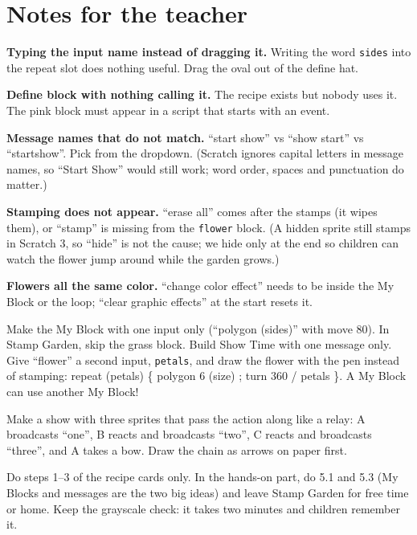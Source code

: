 \section{Notes for the teacher}
\begin{commonmistakes}
  \item \textbf{Typing the input name instead of dragging it.} Writing the word \texttt{sides} into the repeat slot does nothing useful. Drag the oval out of the define hat.
  \item \textbf{Define block with nothing calling it.} The recipe exists but nobody uses it. The pink block must appear in a script that starts with an event.
  \item \textbf{Message names that do not match.} \enquote{start show} vs \enquote{show start} vs \enquote{startshow}. Pick from the dropdown. (Scratch ignores capital letters in message names, so \enquote{Start Show} would still work; word order, spaces and punctuation do matter.)
  \item \textbf{Stamping does not appear.} \enquote{erase all} comes after the stamps (it wipes them), or \enquote{stamp} is missing from the \texttt{flower} block. (A hidden sprite still stamps in Scratch 3, so \enquote{hide} is not the cause; we hide only at the end so children can watch the flower jump around while the garden grows.)
  \item \textbf{Flowers all the same color.} \enquote{change color effect} needs to be inside the My Block or the loop; \enquote{clear graphic effects} at the start resets it.
\end{commonmistakes}

\begin{differentiation}
\supportpath Make the My Block with one input only (\enquote{polygon (sides)} with move 80). In Stamp Garden, skip the grass block. Build Show Time with one message only.
\extensionpath Give \enquote{flower} a second input, \texttt{petals}, and draw the flower with the pen instead of stamping: repeat (petals) \{ polygon 6 (size) ; turn 360 / petals \}. A My Block can use another My Block!
\end{differentiation}

\begin{stretchchallenge}
Make a show with three sprites that pass the action along like a relay: A broadcasts \enquote{one}, B reacts and broadcasts \enquote{two}, C reacts and broadcasts \enquote{three}, and A takes a bow. Draw the chain as arrows on paper first.
\end{stretchchallenge}

\begin{teachernote}
Do steps 1--3 of the recipe cards only. In the hands-on part, do 5.1 and 5.3 (My Blocks and messages are the two big ideas) and leave Stamp Garden for free time or home. Keep the grayscale check: it takes two minutes and children remember it.
\end{teachernote}
